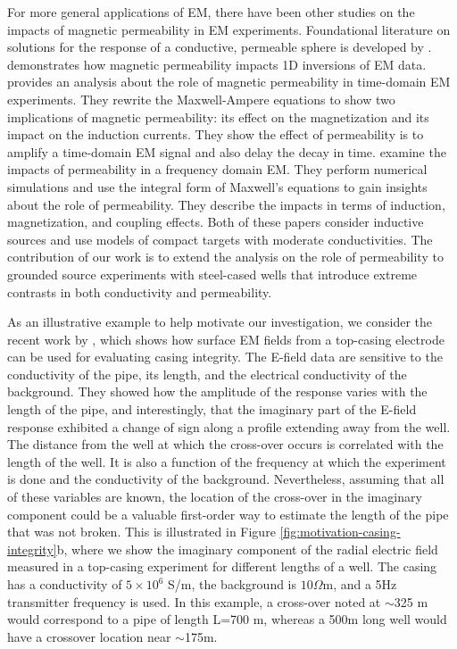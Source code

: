 \documentclass[onecolumn, extra, mreferee]{gji}
\begin{document}
For more general applications of EM, there have been other studies on the impacts of magnetic permeability in EM experiments. Foundational literature on solutions for the response of a conductive, permeable sphere is developed by \cite{wait_conducting_1951, wait_conducting_1953, ward_unique_1959}. \cite{zhang_simultaneous_1999} demonstrates how magnetic permeability impacts 1D inversions of EM data. \cite{Pavlov2001} provides an analysis about the role of magnetic permeability in time-domain EM experiments. They rewrite the Maxwell-Ampere equations to show two implications of magnetic permeability: its effect on the  magnetization and its impact on the induction currents. They show the effect of permeability is to amplify a time-domain EM signal and also delay the decay in time. \cite{Noh2016} examine the impacts of permeability in a frequency domain EM. They perform numerical simulations and use the integral form of Maxwell's equations to gain insights about the role of permeability. They describe the impacts in terms of induction, magnetization, and coupling effects. Both of these papers consider inductive sources and use models of compact targets with moderate conductivities. The contribution of our work is to extend the analysis on the role of permeability to grounded source experiments with steel-cased wells that introduce extreme contrasts in both conductivity and permeability.

As an illustrative example to help motivate our investigation, we consider the recent work by \cite{wilt_casing_2020}, which shows how surface EM fields from a top-casing electrode can be used for evaluating casing integrity. The E-field data are sensitive to the conductivity of the pipe, its length, and the electrical conductivity of the background. They showed how the amplitude of the response varies with the length of the pipe, and interestingly, that the imaginary part of the E-field response exhibited a change of sign along a profile extending away from the well. The distance from the well at which the cross-over occurs is correlated with the length of the well. It is also a function of the frequency at which the experiment is done and the conductivity of the background. Nevertheless, assuming that all of these variables are known, the location of the cross-over in the imaginary component could be a valuable first-order way to estimate the length of the pipe that was not broken. This is illustrated in Figure \ref{fig:motivation-casing-integrity}b, where we show the imaginary component of the radial electric field measured in a top-casing experiment for different lengths of a well. The casing has a conductivity of $5\times 10^6$  S/m, the background is $10  \Omega$m, and a 5Hz transmitter frequency is used. In this example, a cross-over noted at $\sim$325 m would correspond to a pipe of length L=700 m, whereas a 500m long well would have a crossover location near $\sim$175m.
\end{document}
